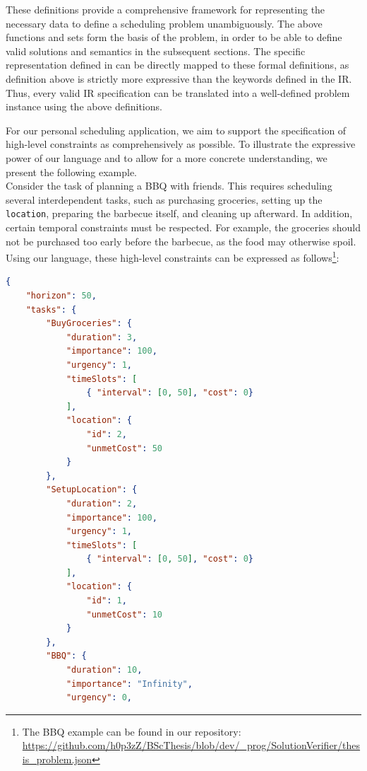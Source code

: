 These definitions provide a comprehensive framework for representing the necessary data to define a scheduling problem unambiguously. The above functions and sets form the basis of the problem, in order to be able to define valid solutions and semantics in the subsequent sections. The specific representation defined in  can be directly mapped to these formal definitions, as definition above is strictly more expressive than the keywords defined in the \ac{IR}. Thus, every valid \ac{IR} specification can be translated into a well-defined problem instance using the above definitions.

\begin{example}
      \label{ex:scheduling-scenario}
      For our personal scheduling application, we aim to support the specification of high-level constraints as comprehensively as possible. To illustrate the expressive power of our language and to allow for a more concrete understanding, we present the following example. \\
      Consider the task of planning a \Ac{BBQ} with friends. This requires scheduling several interdependent tasks, such as purchasing groceries, setting up the \texttt{location}, preparing the barbecue itself, and cleaning up afterward. In addition, certain temporal constraints must be respected. For example, the groceries should not be purchased too early before the barbecue, as the food may otherwise spoil. Using our language, these high-level constraints can be expressed as follows\footnote{The \ac{BBQ} example can be found in our repository: \url{https://github.com/h0p3zZ/BScThesis/blob/dev/_prog/SolutionVerifier/thesis_problem.json}}:
      \begin{lstlisting}[language=json]
{
    "horizon": 50,
    "tasks": {
        "BuyGroceries": {
            "duration": 3,
            "importance": 100,
            "urgency": 1,
            "timeSlots": [
                { "interval": [0, 50], "cost": 0}
            ],
            "location": {
                "id": 2,
                "unmetCost": 50
            }
        },
        "SetupLocation": {
            "duration": 2,
            "importance": 100,
            "urgency": 1,
            "timeSlots": [
                { "interval": [0, 50], "cost": 0}
            ],
            "location": {
                "id": 1,
                "unmetCost": 10
            }
        },
        "BBQ": {
            "duration": 10,
            "importance": "Infinity",
            "urgency": 0,

\end{lstlisting}
\end{example}
